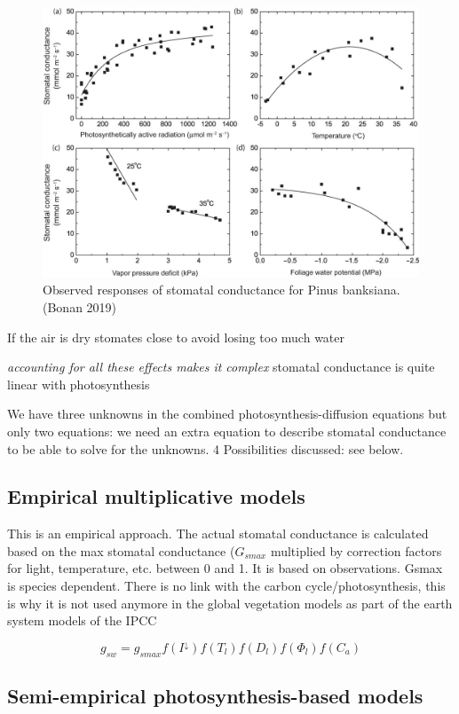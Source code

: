 \documentclass[12pt,oneside]{book}
\begin{document}
\begin{figure}

{\centering \includegraphics[width=0.8\linewidth]{figures/chap2/gs_obs} 

}

\caption{Observed responses of stomatal conductance for Pinus banksiana. (Bonan 2019)}\label{fig:f212}
\end{figure}

If the air is dry stomates close to avoid losing too much water

\emph{accounting for all these effects makes it complex }stomatal
conductance is quite linear with photosynthesis

We have three unknowns in the combined photosynthesis-diffusion
equations but only two equations: we need an extra equation to describe
stomatal conductance to be able to solve for the unknowns. 4
Possibilities discussed: see below.

\subsection{Empirical multiplicative
models}\label{empirical-multiplicative-models}

This is an empirical approach. The actual stomatal conductance is
calculated based on the max stomatal conductance (\(G_{smax}\)
multiplied by correction factors for light, temperature, etc. between 0
and 1. It is based on observations. Gsmax is species dependent. There is
no link with the carbon cycle/photosynthesis, this is why it is not used
anymore in the global vegetation models as part of the earth system
models of the IPCC

\[
g_{sw}=g_{smax}f(I^{\downarrow})f(T_l)f(D_l)f(\Phi_l)f(C_a)
\]

\subsection{Semi-empirical photosynthesis-based
models}\label{semi-empirical-photosynthesis-based-models}
\end{document}
